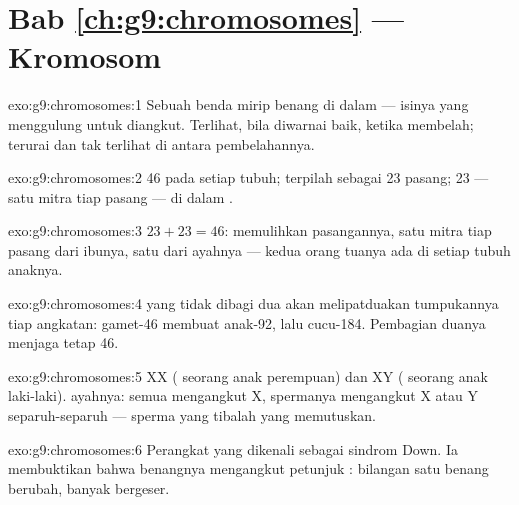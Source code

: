 \section*{Bab \ref{ch:g9:chromosomes} --- Kromosom}

\begin{solution}{exo:g9:chromosomes:1}
Sebuah benda mirip benang di dalam  --- isinya
yang menggulung untuk diangkut. Terlihat, bila diwarnai
baik, ketika  membelah; terurai dan tak terlihat di
antara pembelahannya.
\end{solution}

\begin{solution}{exo:g9:chromosomes:2}
46 pada setiap  tubuh; terpilah sebagai 23 pasang; 23 ---
satu mitra tiap pasang --- di dalam .
\end{solution}

\begin{solution}{exo:g9:chromosomes:3}
$23 + 23 = 46$:  memulihkan pasangannya, satu
mitra tiap pasang dari ibunya, satu dari ayahnya --- kedua
orang tuanya ada di setiap  tubuh anaknya.
\end{solution}

\begin{solution}{exo:g9:chromosomes:4}
 yang tidak dibagi dua akan melipatduakan tumpukannya
tiap angkatan: gamet-46 membuat anak-92, lalu cucu-184.
Pembagian duanya menjaga  tetap 46.
\end{solution}

\begin{solution}{exo:g9:chromosomes:5}
XX ( seorang anak perempuan) dan XY (
seorang anak laki-laki).  ayahnya:  semua
mengangkut X, spermanya mengangkut X atau Y separuh-separuh
--- sperma yang tibalah yang memutuskan.
\end{solution}

\begin{solution}{exo:g9:chromosomes:6}
Perangkat  yang dikenali sebagai sindrom Down. Ia
membuktikan bahwa benangnya mengangkut petunjuk :
bilangan satu benang berubah, banyak  bergeser.
\end{solution}

